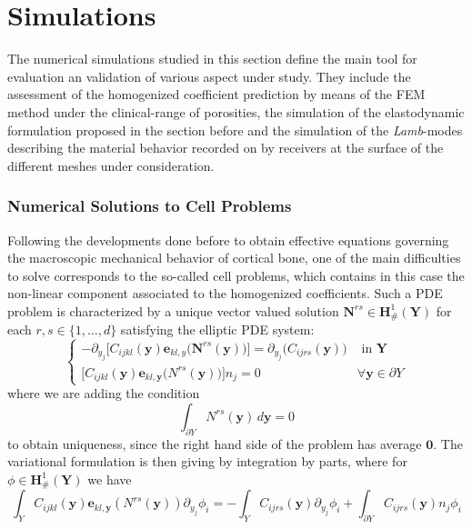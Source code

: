 \chapter{Simulations}
The numerical simulations studied in this section define the main tool for evaluation an validation of various aspect under study. They include the assessment of the homogenized coefficient prediction by means of the FEM method under the clinical-range of porosities, the simulation of the elastodynamic formulation proposed in the section before and the simulation of the \textit{Lamb}-modes describing the material behavior recorded on by receivers at the surface of the different meshes under consideration.

\subsection{Numerical Solutions to Cell Problems}
Following the developments done before to obtain effective equations governing the macroscopic mechanical behavior of cortical bone, one of the main difficulties to solve corresponds to the so-called cell problems, which contains in this case the non-linear component associated to the homogenized coefficients.
Such a PDE problem is characterized by a unique vector valued solution $\mathbf{N}^{rs} \in \mathbf{H}^1_{\#} (\mathbf{Y})$ for each $r,s \in \{1,\dots, d\}$ satisfying the elliptic PDE system:
\begin{equation*}
    \left \{
    \begin{array}{cc}
        - \partial_{y_j} \big[C_{ijkl}(\mathbf{y}) \mathbf{e}_{kl,y} \big( \mathbf{N}^{rs}(\mathbf{y}) \big)  \big] = \partial_{y_j} \big( C_{ijrs} (\mathbf{y}) \big)& \text{ in } \mathbf{Y} \\
        \big[ C_{ijkl}(\mathbf{y}) \mathbf{e}_{kl,\mathbf{y}}\big( N^{rs}(\mathbf{y}) \big) \big]n_j = 0 &  \forall \mathbf{y} \in \partial Y
    \end{array}
    \right.
\end{equation*}
where we are adding the condition 
\begin{equation*}
    \int_{\partial Y} N^{rs}(\mathbf{y}) \, d\mathbf{y} = 0
\end{equation*}
to obtain uniqueness, since the right hand side of the problem has average $\mathbf{0}$.
The variational formulation is then giving by integration by parts, where for $\phi \in \mathbf{H}^1_{\#}(\mathbf{Y})$ we have
\begin{equation*}
    \int_{Y} C_{ijkl}(\mathbf{y}) \mathbf{e}_{kl,\mathbf{y}}(N^{rs}(\mathbf{y})) \partial_{y_j}\phi_i = - \int_{Y}C_{ijrs}(\mathbf{y}) \partial_{y_j} \phi_i + \int_{\partial Y}C_{ijrs}(\mathbf{y}) n_j \phi_i
\end{equation*}

